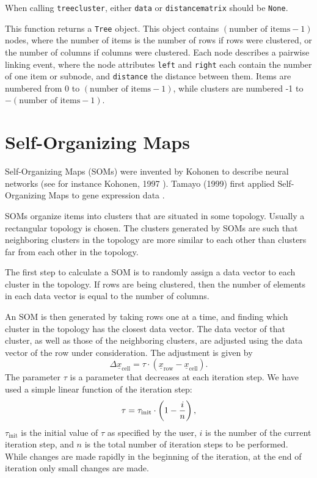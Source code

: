 \documentclass{report}
\begin{document}
When calling \verb|treecluster|, either \verb|data| or \verb|distancematrix| should be \verb|None|.

This function returns a \verb|Tree| object. This object contains $\left(\textrm{number of items} - 1\right)$ nodes, where the number of items is the number of rows if rows were clustered, or the number of columns if columns were clustered. Each node describes a pairwise linking event, where the node attributes \verb|left| and \verb|right| each contain the number of one item or subnode, and \verb|distance| the distance between them. Items are numbered from 0 to $\left(\textrm{number of items} - 1\right)$, while clusters are numbered -1 to $-\left(\textrm{number of items}-1\right)$.

\section{Self-Organizing Maps}

Self-Organizing Maps (SOMs) were invented by Kohonen to describe neural networks (see for instance Kohonen, 1997 \cite{kohonen1997}). Tamayo (1999) first applied Self-Organizing Maps to gene expression data \cite{tamayo1999}.

SOMs organize items into clusters that are situated in some topology. Usually a rectangular topology is chosen. The clusters generated by SOMs are such that neighboring clusters in the topology are more similar to each other than clusters far from each other in the topology.

The first step to calculate a SOM is to randomly assign a data vector to each cluster in the topology. If rows are being clustered, then the number of elements in each data vector is equal to the number of columns.

An SOM is then generated by taking rows one at a time, and finding which cluster in the topology has the closest data vector. The data vector of that cluster, as well as those of the neighboring clusters, are adjusted using the data vector of the row under consideration. The adjustment is given by
$$\Delta \underline{x}_{\textrm{cell}} = \tau \cdot \left(\underline{x}_{\textrm{row}} - \underline{x}_{\textrm{cell}} \right).$$
The parameter
$\tau$
is a parameter that decreases at each iteration step. We have used a simple linear function of the iteration step:
$$\tau = \tau_{\textrm{init}} \cdot \left(1 - {i \over n}\right),$$
$\tau_{\textrm{init}}$
is the initial value of $\tau$ as specified by the user, $i$ is the number of the current iteration step, and $n$ is the total number of iteration steps to be performed. While changes are made rapidly in the beginning of the iteration, at the end of iteration only small changes are made.
\end{document}
